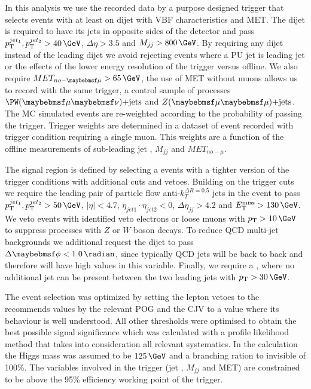 In this analysis we use the recorded data by a purpose designed trigger that selects events with at least on dijet with \gls{VBF} characteristics and \gls{MET}. The dijet is required to have its jets in opposite sides of the detector and pass $\pt^{jet_1},\pt^{jet_2} > 40\,\GeV$, $\Delta\eta > 3.5$ and $M_{jj} > 800\,\GeV$. By requiring any dijet instead of the leading dijet we avoid rejecting events where a \gls{PU} jet is leading jet or the effects of the lower energy resolution of the trigger versus offline. We also require $MET_{no-\mu} > 65\,\GeV$, the use of \gls{MET} without muons allows us to record with the same trigger, a control sample of processes  $\PW(\mu\nu)\text{+jets}$ and $\Z(\mu\mu)\text{+jets}$. The \gls{MC} simulated events are re-weighted according to the probability of passing the trigger. Trigger weights are determined in a dataset of event recorded with trigger condition requiring a single muon. This weights are a function of the offline measurements of sub-leading jet \pt, $M_{jj}$ and $MET_{no-\mu}$.


The signal region is defined by selecting a events with a tighter version of the trigger conditions with additional cuts and vetoes. Building on the trigger cuts we require the leading pair of particle flow \cite{ARTICLE:CMSParticleFlowEventRecontruction} anti-$k_T^{\Delta R=0.5}$ jets in the event to pass $\pt^{jet_1},\pt^{jet_2} > 50\,\GeV$, $|\eta| < 4.7$, $\eta_{jet1} \cdot \eta_{jet2} < 0$, $\Delta\eta_{jj}>4.2$ and $\MET > 130\,\GeV$. We veto events with identified veto electrons or loose muons  with $\pt>10\,\GeV$ to suppress processes with $Z$ or $W$ boson decays. To reduce \gls{QCD} multi-jet backgrounds we additional request the dijet to pass $\Delta\phi < 1.0\,\radian$, since typically \gls{QCD} jets will be back to back and therefore will have high values in this variable. Finally, we require a , where no additional jet can be present between the two leading jets with $\pt > 30\,\GeV$.

The event selection was optimized by setting the lepton vetoes to the recommends values by the relevant \gls{POG} and the \gls{CJV} to a value where its behaviour is well understood. All other thresholds were optimised to obtain the best possible signal significance which was calculated with a profile likelihood method that takes into consideration all relevant systematics. In the calculation the Higgs mass was assumed to be $125\,\GeV$ and a branching ration to invisible of 100\%. The variables involved in the trigger (jet \pt, $M_{jj}$ and \gls{MET}) are constrained to be above the 95\% efficiency working point of the trigger.

